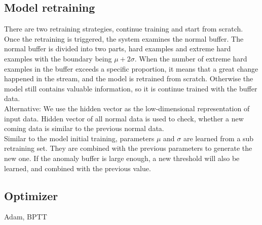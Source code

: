 \subsection{Model retraining}
\label{retraining}

There are two retraining strategies, continue training and start from scratch. Once the retraining is triggered, the system examines the normal buffer. The normal buffer is divided into two parts, hard examples and extreme hard examples with the boundary being $\mu+2\sigma$. When the number of extreme hard examples in the buffer exceeds a specific proportion, it means that a great change happened in the stream, and the model is retrained from scratch. Otherwise the model still contains valuable information, so it is continue trained with the buffer data.\\

Alternative: We use the hidden vector as the low-dimensional representation of input data. Hidden vector of all normal data is used to check, whether a new coming data is similar to the previous normal data.\\

Similar to the model initial training, parameters $\mu$ and $\sigma$ are learned from a sub retraining set. They are combined with the previous parameters to generate the new one. If the anomaly buffer is large enough, a new threshold will also be learned, and combined with the previous value.


\subsection{Optimizer}
\label{optimizer}
Adam, BPTT




